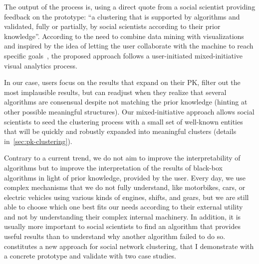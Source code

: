 The output of the process is, using a direct quote from a social scientist providing feedback on the prototype: ``a clustering that is supported by algorithms and validated, fully or partially, by social scientists according to their prior knowledge''.
According to the need to combine data mining with visualizations~\cite{shneidermanInventingDiscoveryTools2002} and inspired by the idea of letting the user collaborate with the machine to reach specific goals~\cite{horvitzPrinciplesMixedinitiativeUser1999}, the proposed approach follows a user-initiated mixed-initiative~\cite{horvitzPrinciplesMixedinitiativeUser1999} visual analytics process.

In our case, users focus on the results that expand on their PK, filter out the most implausible results, but can readjust  when they realize that several algorithms are consensual despite not matching the prior knowledge (hinting at other possible meaningful structures). Our mixed-initiative approach allows social scientists to seed the clustering process with a small set of well-known entities that will be quickly and robustly expanded into meaningful clusters (details in~\autoref{sec:pk-clustering}).

Contrary to a current trend\cite{molnar2019}, we do not aim to improve the interpretability of algorithms but to improve the interpretation of the results of black-box algorithms in light of prior knowledge, provided by the user. Every day, we use complex mechanisms that we do not fully understand, like motorbikes, cars, or electric vehicles using various kinds of engines, shifts, and gears, but we are still able to choose which one best fits our needs according to their external utility and not by understanding their complex internal machinery. In addition, it is usually more important to social scientists to find an algorithm that provides useful results than to understand why another algorithm failed to do so.
\pkclustering constitutes a new approach for social network clustering, that I demonstrate with a concrete prototype and validate with two case studies.

